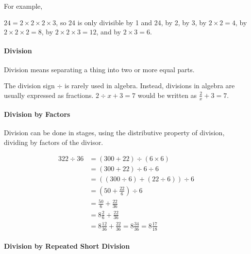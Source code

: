 \documentclass[12pt]{article}
\begin{document}
For example,
\begin{center}
\end{center}

$24 = 2 \times 2 \times 2 \times 3$, so 24 is only divisible by 1 and 24, by 2, by 3, by $2 \times 2 = 4$, by $2 \times 2 \times 2 = 8$, by $2 \times 2 \times 3 = 12$, and by $2 \times 3 = 6$.

\paragraph{Division}
Division means separating a thing into two or more equal parts.

\item The division sign $\div$ is rarely used in algebra. Instead, divisions in algebra are usually expressed as fractions. \( 2 \div x + 3 = 7 \) would be written as \( \frac{2}{x} + 3 = 7 \).

\paragraph{Division by Factors}

Division can be done in stages, using the distributive property of division, dividing by factors of the divisor.

\begin{align*}
322 \div 36 & = (300+22) \div (6 \times 6)\\
            & = (300+22) \div 6 \div 6\\
            & = ((300 \div 6)+(22 \div 6)) \div 6\\
            & = (50 + \frac{22}{6}) \div 6\\
            & = \frac{50}{6} + \frac{22}{36}\\
            & = 8 \frac{2}{6} + \frac{22}{36}\\
            & = 8 \frac{12}{36} + \frac{22}{36} = 8 \frac{34}{36} = 8 \frac{17}{18}
\end{align*}

\paragraph{Division by Repeated Short Division}
\end{document}
